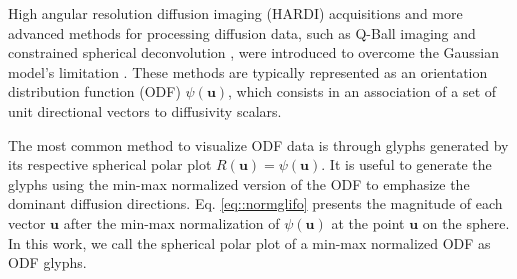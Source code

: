 \documentclass[twoside,twocolumn,10pt]{article}
\begin{document}
High angular resolution diffusion imaging (HARDI) acquisitions and more advanced methods for processing diffusion data, such as Q-Ball imaging \cite{TuchQBall2004} and constrained spherical deconvolution \cite{tournier2007}, were introduced to overcome the Gaussian model's limitation \cite{descoteaux2015}. These methods are typically represented as an orientation distribution function (ODF) $\psi(\bm{u})$, which consists in an association of a set of unit directional vectors to diffusivity scalars. %



The most common method to visualize ODF data is through glyphs generated by its respective spherical polar plot $R(\bm{u})=\psi (\bm{u})$. It is useful to generate the glyphs using the min-max normalized version of the ODF \cite{TuchQBall2004} to emphasize the dominant diffusion directions. Eq. \ref{eq::normglifo} presents the magnitude of each vector $\bm{u}$ after the min-max normalization of $\psi(\bm{u})$ at the point $\bm{u}$ on the sphere. In this work, we call the spherical polar plot of a min-max normalized ODF as ODF glyphs.
\end{document}

